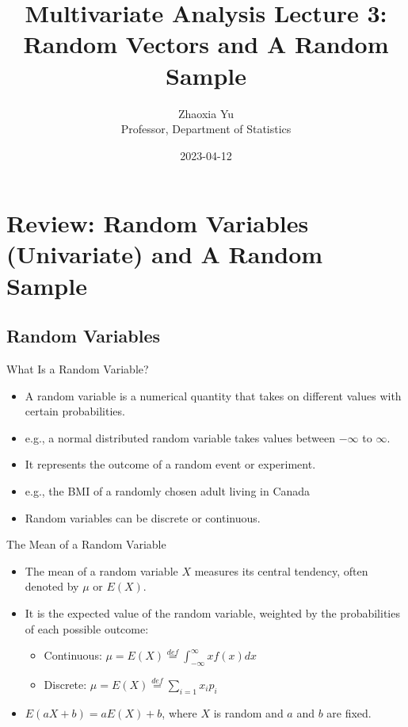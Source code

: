 \documentclass[
  ignorenonframetext,
]{beamer}
\title{Multivariate Analysis Lecture 3: Random Vectors and A Random
Sample}
\author{Zhaoxia Yu\\
Professor, Department of Statistics}
\date{2023-04-12}
\providecommand{\tightlist}{%
  \setlength{\itemsep}{0pt}\setlength{\parskip}{0pt}}
\begin{document}
\frame{\titlepage}

\hypertarget{review-random-variables-univariate-and-a-random-sample}{%
\section{Review: Random Variables (Univariate) and A Random
Sample}\label{review-random-variables-univariate-and-a-random-sample}}

\hypertarget{random-variables}{%
\subsection{Random Variables}\label{random-variables}}

\begin{frame}{What Is a Random Variable?}
\protect\hypertarget{what-is-a-random-variable}{}
\begin{itemize}
\item
  A random variable is a numerical quantity that takes on different
  values with certain probabilities.
\item
  e.g., a normal distributed random variable takes values between
  \(-\infty\) to \(\infty\).
\item
  It represents the outcome of a random event or experiment.
\item
  e.g., the BMI of a randomly chosen adult living in Canada
\item
  Random variables can be discrete or continuous.
\end{itemize}
\end{frame}

\begin{frame}{The Mean of a Random Variable}
\protect\hypertarget{the-mean-of-a-random-variable}{}
\begin{itemize}
\tightlist
\item
  The mean of a random variable \(X\) measures its central tendency,
  often denoted by \(\mu\) or \(E(X)\).
\item
  It is the expected value of the random variable, weighted by the
  probabilities of each possible outcome:

  \begin{itemize}
  \tightlist
  \item
    Continuous:
    \(\mu = E(X)\overset{def}= \int_{-\infty}^{\infty} x f(x) dx\)
  \item
    Discrete: \(\mu = E(X)\overset{def}= \sum_{i=1}^{} x_i p_i\)
  \end{itemize}
\item
  \(E(aX+b)=aE(X)+b\), where \(X\) is random and \(a\) and \(b\) are
  fixed.
\end{itemize}
\end{frame}
\end{document}
